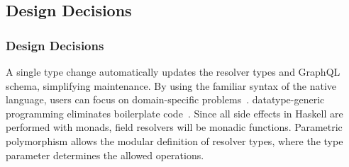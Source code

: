 
\subsection{Design Decisions} 

\begin{frame}\frametitle{Design Decisions}

\begin{itemize}
     A single type change automatically updates the resolver types and GraphQL schema, simplifying maintenance. 
     By using the familiar syntax of the native language, users can focus on domain-specific problems~\cite{edsl-modeling}.
    datatype-generic programming eliminates boilerplate code~\cite{scrap-your-boilerplate}.
     Since all side effects in Haskell are performed with monads, field resolvers will be monadic functions. 
     Parametric polymorphism allows the modular definition of resolver types, where the type parameter determines the allowed operations.
\end{itemize}
\end{frame}
